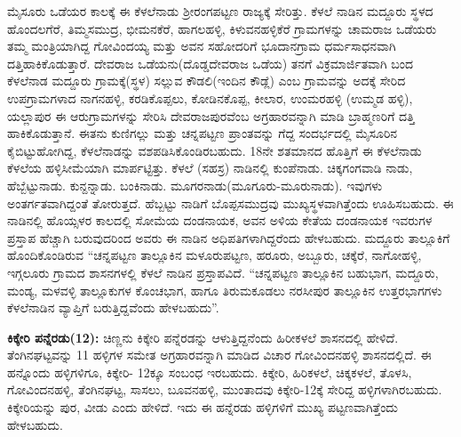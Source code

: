 ಮೈಸೂರು ಒಡೆಯರ ಕಾಲಕ್ಕೆ ಈ ಕೆಳಲೆನಾಡು ಶ‍್ರೀರಂಗಪಟ್ಟಣ ರಾಜ್ಯಕ್ಕೆ ಸೇರಿತ್ತು. ಕೆಳಲೆ ನಾಡಿನ ಮದ್ದೂರು ಸ್ಥಳದ ಹೊಂದಲಗೆರೆ, ತಿಮ್ಮಸಮುದ್ರ, ಭೀಮನಕೆರೆ, ಹಾಗಲಹಳ್ಳಿ, ಕಿಳುವನಹಳ್ಳಿಕೆರೆ ಗ್ರಾಮಗಳನ್ನು ಚಾಮರಾಜ ಒಡೆಯರು ತಮ್ಮ ಮಂತ್ರಿಯಾಗಿದ್ದ ಗೋವಿಂದಯ್ಯ ಮತ್ತು ಅವನ ಸಹೋದರಿಗೆ ಭೂದಾನಗ್ರಾಮ ಧರ್ಮಸಾಧನವಾಗಿ ದತ್ತಿಹಾಕಿಕೊಡುತ್ತಾರೆ. ದೇವರಾಜ ಒಡೆಯನು(ದೊಡ್ಡದೇವರಾಜ ಒಡೆಯ) ತನಗೆ ವಿಕ್ರಮಾರ್ಜಿತವಾಗಿ ಬಂದ ಕೆಳಲೆನಾಡ ಮದ್ದೂರು ಗ್ರಾಮಕ್ಕೆ(ಸ್ಥಳ) ಸಲ್ಲುವ ಕೌಡಲಿ(ಇಂದಿನ ಕೌಡ್ಲೆ) ಎಂಬ ಗ್ರಾಮವನ್ನು ಅದಕ್ಕೆ ಸೇರಿದ ಉಪಗ್ರಾಮಗಳಾದ ನಾಗನಹಳ್ಳಿ, ಕರಡಿಕೊಪ್ಪಲು, ಕೋಡಿನಕೊಪ್ಪ, ಕೀಲಾರ, ಉಂಮರಹಳ್ಳಿ (ಉಮ್ಮಡ ಹಳ್ಳಿ), ಯಲ್ಲಾಪುರ ಈ ಆರುಗ್ರಾಮಗಳನ್ನು ಸೇರಿಸಿ ದೇವರಾಜಪುರವೆಂಬ ಅಗ್ರಹಾರವನ್ನಾಗಿ ಮಾಡಿ ಬ್ರಾಹ್ಮಣರಿಗೆ ದತ್ತಿ ಹಾಕಿಕೊಡುತ್ತಾನೆ. ಈತನು ಕುಣಿಗಲ್ಲು ಮತ್ತು ಚನ್ನಪಟ್ಟಣ ಪ್ರಾಂತವನ್ನು ಗೆದ್ದ ಸಂದರ್ಭದಲ್ಲಿ ಮೈಸೂರಿನ ಕೈಬಿಟ್ಟುಹೋಗಿದ್ದ, ಕೆಳಲೆನಾಡನ್ನು ವಶಪಡಿಸಿಕೊಂಡಿರಬಹುದು. 18ನೇ ಶತಮಾನದ ಹೊತ್ತಿಗೆ ಈ ಕೆಳಲೆನಾಡು ಕೆಳಲೆಯ ಹಳ್ಳಿಸೀಮೆಯಾಗಿ ಮಾರ್ಪಟ್ಟಿತ್ತು. ಕೆಳಲೆ (ಸಹಸ್ರ) ನಾಡಿನಲ್ಲಿ ಕುಂಪೆನಾಡು. ಚಿಕ್ಕಗಂಗವಾಡಿ ನಾಡು, ಹೆಬ್ಬೆಟ್ಟುನಾಡು. ಕುನ್ದನ್ನಾಡು. ಬಂಕಿನಾಡು. ಮೂಗರನಾಡು(ಮೂಗೂರು-ಮೂರುನಾಡು). ಇವುಗಳು ಅಂತರ್ಗತ\-ವಾಗಿದ್ದಂತೆ ತೋರುತ್ತದೆ. ಹೆಬ್ಬಟ್ಟು ನಾಡಿಗೆ ಬೊಪ್ಪಸಮುದ್ರವು ಮುಖ್ಯಸ್ಥಳವಾಗಿತ್ತೆಂದು ಊಹಿಸಬಹುದು. ಈ ನಾಡಿನಲ್ಲಿ ಹೊಯ್ಸಳರ ಕಾಲದಲ್ಲಿ ಸೋಮೆಯ ದಂಡನಾಯಕ, ಅವನ ಅಳಿಯ ಕೇತೆಯ ದಂಡನಾಯಕ ಇವರುಗಳ ಪ್ರಸ್ತಾಪ ಹೆಚ್ಚಾಗಿ ಬರುವುದರಿಂದ ಅವರು ಈ ನಾಡಿನ ಅಧಿಪತಿಗಳಾಗಿದ್ದರೆಂದು ಹೇಳಬಹುದು. ಮದ್ದೂರು ತಾಲ್ಲೂಕಿಗೆ ಹೊಂದಿಕೊಂಡಿರುವ “ಚನ್ನಪಟ್ಟಣ ತಾಲ್ಲೂಕಿನ ಮಳೂರುಪಟ್ಟಣ, ಹರೂರು, ಅಬ್ಬೂರು, ಚಕ್ಕೆರೆ, ನಾಗೋಹಳ್ಳಿ, ಇಗ್ಗಲೂರು ಗ್ರಾಮದ ಶಾಸನಗಳಲ್ಲಿ ಕೆಳಲೆ ನಾಡಿನ ಪ್ರಸ್ತಾಪವಿದೆ. “ಚನ್ನಪಟ್ಟಣ ತಾಲ್ಲೂಕಿನ ಬಹುಭಾಗ, ಮದ್ದೂರು, ಮಂಡ್ಯ, ಮಳವಳ್ಳಿ ತಾಲ್ಲೂಕುಗಳ ಕೊಂಚಭಾಗ, ಹಾಗೂ ತಿರುಮಕೂಡಲು ನರಸೀಪುರ ತಾಲ್ಲೂಕಿನ ಉತ್ತರಭಾಗಗಳು ಕೆಳಲೆನಾಡಿನ ವ್ಯಾಪ್ತಿಗೆ ಬರುತ್ತಿದ್ದವೆಂದು ಹೇಳಬಹುದು”.

\textbf{ಕಿಕ್ಕೇರಿ ಪನ್ನೆರಡು(12):} ಚಿಣ್ಣನು	 ಕಿಕ್ಕೇರಿ ಪನ್ನೆರಡನ್ನು ಆಳುತ್ತಿದ್ದನೆಂದು ಹಿರೀಕಳಲೆ ಶಾಸನದಲ್ಲಿ ಹೇಳಿದೆ. ತೆಂಗಿನಘಟ್ಟವನ್ನು 11 ಹಳ್ಳಿಗಳ ಸಮೇತ ಅಗ್ರಹಾರವನ್ನಾಗಿ ಮಾಡಿದ ವಿಚಾರ ಗೋವಿಂದನಹಳ್ಳಿ ಶಾಸನದಲ್ಲಿದೆ. ಈ ಹನ್ನೊಂದು ಹಳ್ಳಿಗಳಿಗೂ, ಕಿಕ್ಕೇರಿ- 12ಕ್ಕೂ ಸಂಬಂಧ ಇರಬಹುದು. ಕಿಕ್ಕೇರಿ, ಹಿರಿಕಳಲೆ, ಚಿಕ್ಕಕಳಲೆ, ತೊಳಸಿ, ಗೋವಿಂದನಹಳ್ಳಿ, ತೆಂಗಿನಘಟ್ಟ, ಸಾಸಲು, ಬೂವನಹಳ್ಳಿ, ಮುಂತಾದವು ಕಿಕ್ಕೇರಿ-12ಕ್ಕೆ ಸೇರಿದ್ದ ಹಳ್ಳಿಗಳಾಗಿರಬಹುದು. ಕಿಕ್ಕೇರಿಯನ್ನು ಪುರ, ವೀಡು ಎಂದು ಹೇಳಿದೆ. ಇದು ಈ ಹನ್ನೆರಡು ಹಳ್ಳಿಗಳಿಗೆ ಮುಖ್ಯ ಪಟ್ಟಣವಾಗಿತ್ತೆಂದು ಹೇಳಬಹುದು.

